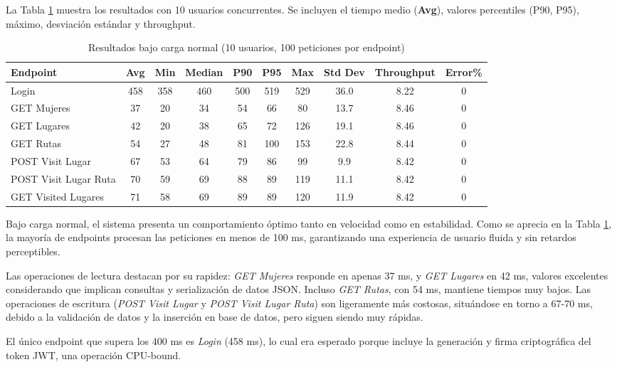 La Tabla \ref{tab:normal} muestra los resultados con 10 usuarios concurrentes. Se incluyen el tiempo medio (\textbf{Avg}), valores percentiles (P90, P95), máximo, desviación estándar y throughput.

\begin{table}[H]
\centering
\caption{Resultados bajo carga normal (10 usuarios, 100 peticiones por endpoint)}
\label{tab:normal}
\scriptsize
\begin{tabular}{|l|c|c|c|c|c|c|c|c|c|}
\hline
\textbf{Endpoint} & \textbf{Avg} & \textbf{Min} & \textbf{Median} & \textbf{P90} & \textbf{P95} & \textbf{Max} & \textbf{Std Dev} & \textbf{Throughput} & \textbf{Error\%} \\
\hline
Login & 458 & 358 & 460 & 500 & 519 & 529 & 36.0 & 8.22 & 0 \\
GET Mujeres & 37 & 20 & 34 & 54 & 66 & 80 & 13.7 & 8.46 & 0 \\
GET Lugares & 42 & 20 & 38 & 65 & 72 & 126 & 19.1 & 8.46 & 0 \\
GET Rutas & 54 & 27 & 48 & 81 & 100 & 153 & 22.8 & 8.44 & 0 \\
POST Visit Lugar & 67 & 53 & 64 & 79 & 86 & 99 & 9.9 & 8.42 & 0 \\
POST Visit Lugar Ruta & 70 & 59 & 69 & 88 & 89 & 119 & 11.1 & 8.42 & 0 \\
GET Visited Lugares & 71 & 58 & 69 & 89 & 89 & 120 & 11.9 & 8.42 & 0 \\
\hline
\end{tabular}
\end{table}
Bajo carga normal, el sistema presenta un comportamiento óptimo tanto en velocidad como en estabilidad. Como se aprecia en la Tabla \ref{tab:normal}, la mayoría de endpoints procesan las peticiones en menos de 100 ms, garantizando una experiencia de usuario fluida y sin retardos perceptibles.

Las operaciones de lectura destacan por su rapidez: \textit{GET Mujeres} responde en apenas 37 ms, y \textit{GET Lugares} en 42 ms, valores excelentes considerando que implican consultas y serialización de datos JSON. Incluso \textit{GET Rutas}, con 54 ms, mantiene tiempos muy bajos. Las operaciones de escritura (\textit{POST Visit Lugar} y \textit{POST Visit Lugar Ruta}) son ligeramente más costosas, situándose en torno a 67-70 ms, debido a la validación de datos y la inserción en base de datos, pero siguen siendo muy rápidas.

El único endpoint que supera los 400 ms es \textit{Login} (458 ms), lo cual era esperado porque incluye la generación y firma criptográfica del token JWT, una operación CPU-bound.

